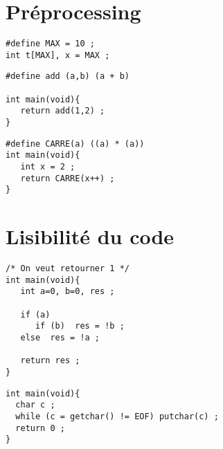 \section{Pr\'eprocessing}
\begin{frame}[fragile]
\begin{verbatim}
#define MAX = 10 ;
int t[MAX], x = MAX ;
\end{verbatim}
\end{frame}
\begin{frame}[fragile]
\begin{verbatim}
#define add (a,b) (a + b)

int main(void){
   return add(1,2) ;
}
\end{verbatim}
\end{frame}
\begin{frame}[fragile]
\begin{verbatim}
#define CARRE(a) ((a) * (a))
int main(void){
   int x = 2 ;
   return CARRE(x++) ;
}
\end{verbatim}
\end{frame}
\section{Lisibilit\'e du code}
\begin{frame}[fragile]
\begin{verbatim}
/* On veut retourner 1 */
int main(void){
   int a=0, b=0, res ;

   if (a) 
      if (b)  res = !b ;
   else  res = !a ;

   return res ;
}
\end{verbatim}
\end{frame}
\begin{frame}[fragile]
\begin{verbatim}
int main(void){
  char c ;
  while (c = getchar() != EOF) putchar(c) ;
  return 0 ;
}
\end{verbatim}
\end{frame}
